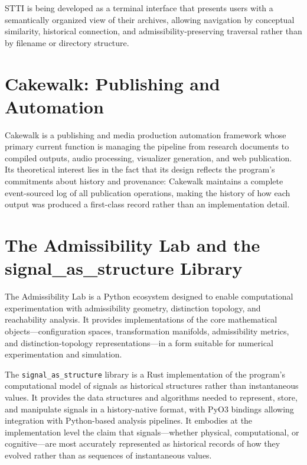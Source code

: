 \documentclass[11pt, oneside]{book}
\theoremstyle{definition}
\theoremstyle{remark}
\begin{document}
STTI is being developed as a terminal interface that presents users with a semantically organized view of their archives, allowing navigation by conceptual similarity, historical connection, and admissibility-preserving traversal rather than by filename or directory structure.

\section{Cakewalk: Publishing and Automation}

Cakewalk is a publishing and media production automation framework whose primary current function is managing the pipeline from research documents to compiled outputs, audio processing, visualizer generation, and web publication. Its theoretical interest lies in the fact that its design reflects the program's commitments about history and provenance: Cakewalk maintains a complete event-sourced log of all publication operations, making the history of how each output was produced a first-class record rather than an implementation detail.

\section{The Admissibility Lab and the signal\_as\_structure Library}

The Admissibility Lab is a Python ecosystem designed to enable computational experimentation with admissibility geometry, distinction topology, and reachability analysis. It provides implementations of the core mathematical objects—configuration spaces, transformation manifolds, admissibility metrics, and distinction-topology representations—in a form suitable for numerical experimentation and simulation.

The \texttt{signal\_as\_structure} library is a Rust implementation of the program's computational model of signals as historical structures rather than instantaneous values. It provides the data structures and algorithms needed to represent, store, and manipulate signals in a history-native format, with PyO3 bindings allowing integration with Python-based analysis pipelines. It embodies at the implementation level the claim that signals—whether physical, computational, or cognitive—are most accurately represented as historical records of how they evolved rather than as sequences of instantaneous values.

\end{document}
